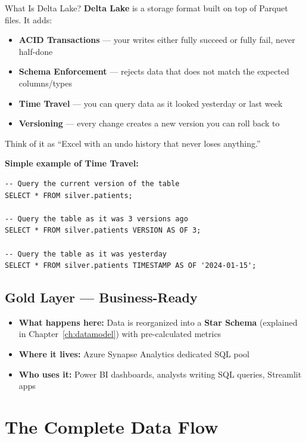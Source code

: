 \documentclass[12pt, a4paper, oneside]{report}
\begin{document}
\begin{conceptbox}{What Is Delta Lake?}
\textbf{Delta Lake} is a storage format built on top of Parquet files. It adds:
\begin{itemize}
    \item \textbf{ACID Transactions} --- your writes either fully succeed or fully fail, never half-done
    \item \textbf{Schema Enforcement} --- rejects data that does not match the expected columns/types
    \item \textbf{Time Travel} --- you can query data as it looked yesterday or last week
    \item \textbf{Versioning} --- every change creates a new version you can roll back to
\end{itemize}
Think of it as ``Excel with an undo history that never loses anything.''

\textbf{Simple example of Time Travel:}
\begin{lstlisting}[style=sqlstyle]
-- Query the current version of the table
SELECT * FROM silver.patients;

-- Query the table as it was 3 versions ago
SELECT * FROM silver.patients VERSION AS OF 3;

-- Query the table as it was yesterday
SELECT * FROM silver.patients TIMESTAMP AS OF '2024-01-15';
\end{lstlisting}
\end{conceptbox}

\subsection{Gold Layer --- Business-Ready}

\begin{itemize}
    \item \textbf{What happens here:} Data is reorganized into a \textbf{Star Schema} (explained in Chapter~\ref{ch:datamodel}) with pre-calculated metrics
    \item \textbf{Where it lives:} Azure Synapse Analytics dedicated SQL pool
    \item \textbf{Who uses it:} Power BI dashboards, analysts writing SQL queries, Streamlit apps
\end{itemize}

\section{The Complete Data Flow}
\end{document}
